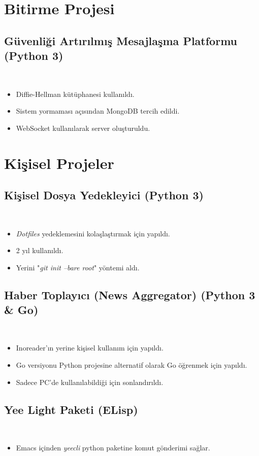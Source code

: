\documentclass[a4paper, 9pt]{extarticle}
\begin{document}
\makebaslik{}
\myegitim{}
\mydeneyim{}

\section{Bitirme Projesi}
\subsection{Güvenliği Artırılmış Mesajlaşma Platformu (Python 3)}
\hfill \\
\begin{itemize}
\item Diffie-Hellman kütüphanesi kullanıldı.
\item Sistem yormaması açısından MongoDB tercih edildi.
\item WebSocket kullanılarak server oluşturuldu.
\end{itemize}

\section{Kişisel Projeler}
\subsection{Kişisel Dosya Yedekleyici (Python 3)} \hfill \\
\begin{itemize}
\item \emph{Dotfiles} yedeklemesini kolaşlaştırmak için yapıldı.
\item 2 yıl kullanıldı.
\item Yerini "\emph{git init --bare root}" yöntemi aldı.
\end{itemize}

\subsection{Haber Toplayıcı (News Aggregator) (Python 3 \& Go)} \hfill \\
\begin{itemize}
\item Inoreader'ın yerine kişisel kullanım için yapıldı.
\item Go versiyonu Python projesine alternatif olarak Go öğrenmek için yapıldı.
\item Sadece PC'de kullanılabildiği için sonlandırıldı.
\end{itemize}

\subsection{Yee Light Paketi (ELisp)} \hfill \\
\begin{itemize}
\item Emacs içinden \emph{yeecli} python paketine komut gönderimi sağlar.
\end{itemize}
\end{document}

